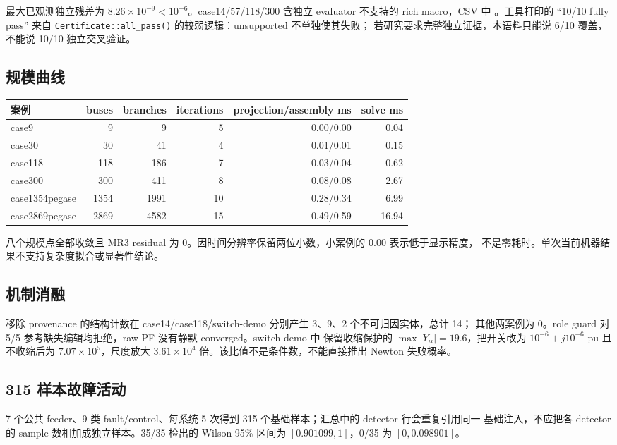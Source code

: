 最大已观测独立残差为 $8.26\times10^{-9}<10^{-6}$。case14/57/118/300 含独立 evaluator 不支持的 rich
macro，CSV 中 。工具打印的
``10/10 fully pass'' 来自 \texttt{Certificate::all\_pass()} 的较弱逻辑：unsupported 不单独使其失败；
若研究要求完整独立证据，本语料只能说 6/10 覆盖，不能说 10/10 独立交叉验证。

\subsection{规模曲线}

\begin{center}\small
\begin{tabular}{@{}lrrrrr@{}}\toprule
案例 & buses & branches & iterations & projection/assembly ms & solve ms\\\midrule
case9 & 9 & 9 & 5 & 0.00/0.00 & 0.04\\
case30 & 30 & 41 & 4 & 0.01/0.01 & 0.15\\
case118 & 118 & 186 & 7 & 0.03/0.04 & 0.62\\
case300 & 300 & 411 & 8 & 0.08/0.08 & 2.67\\
case1354pegase & 1354 & 1991 & 10 & 0.28/0.34 & 6.99\\
case2869pegase & 2869 & 4582 & 15 & 0.49/0.59 & 16.94\\\bottomrule
\end{tabular}
\end{center}
八个规模点全部收敛且 MR3 residual 为 0。因时间分辨率保留两位小数，小案例的 0.00 表示低于显示精度，
不是零耗时。单次当前机器结果不支持复杂度拟合或显著性结论。

\subsection{机制消融}

移除 provenance 的结构计数在 case14/case118/switch-demo 分别产生 3、9、2 个不可归因实体，总计 14；
其他两案例为 0。role guard 对 5/5 参考缺失编辑均拒绝，raw PF 没有静默 converged。switch-demo 中
保留收缩保护的 $\max|Y_{ii}|=19.6$，把开关改为 $10^{-6}+j10^{-6}$ pu 且不收缩后为
$7.07\times10^5$，尺度放大 $3.61\times10^4$ 倍。该比值不是条件数，不能直接推出 Newton 失败概率。

\subsection{315 样本故障活动}

7 个公共 feeder、9 类 fault/control、每系统 5 次得到 315 个基础样本；汇总中的 detector 行会重复引用同一
基础注入，不应把各 detector 的 sample 数相加成独立样本。35/35 检出的 Wilson 95\% 区间为
$[0.901099,1]$，0/35 为 $[0,0.098901]$。


